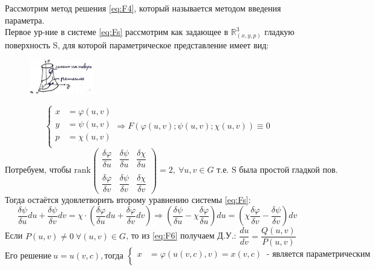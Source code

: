 \begin{proposition}
	Рассмотрим метод решения \eqref{eq:F4}, который называется методом введения параметра. \\
	Первое ур-ние в системе \eqref{eq:Fs} рассмотрим как задающее в $\mathbb{ R }^3_{(x, y, p)} $ гладкую поверхность S, для которой параметрическое представление имеет вид:
	\begin{figure}[!h]
		\centering
		\includegraphics[width = 0.25\textwidth]{image_1.jpeg}
	\end{figure}	
	\[
	\left\{
	\begin{aligned}
		x &= \varphi(u, v)  \\
		y &= \psi(u, v) \\   
		p &= \chi(u, v) \\
	\end{aligned}
	\right.   
	\Rightarrow  F(\varphi(u, v); \psi(u, v); \chi(u, v)) \equiv 0                                                   
	\]
	\[
		\text{Потребуем, чтобы rank}
		\begin{pmatrix}
			\dfrac{\delta\varphi}{\delta u} & \dfrac{\delta \psi}{\delta u} & \dfrac{\delta \chi}{\delta u} \\
			\\
			\dfrac{\delta\varphi}{\delta v} & \dfrac{\delta \psi}{\delta v} & \dfrac{\delta \chi}{\delta v}
		\end{pmatrix} = 2, \ \forall u, v \in G \text{ т.е. S была простой гладкой пов.}
	\]
	Тогда остаётся удовлетворить второму уравнению системы \eqref{eq:Fs}: \\
	\begin{equation} \label{eq:F6}
		\frac{\delta \psi}{\delta u} du + \frac{\delta \psi}{\delta v} dv = \chi \cdot \left(\frac{\delta \varphi}{\delta u}du + \frac{\delta \varphi}{\delta v}dv\right) \Rightarrow \left( \frac{\delta \psi}{\delta u} - \chi \frac{\delta \varphi}{\delta u} \right) du = \left(\chi \frac{\delta \varphi}{\delta v} - \frac{\delta \psi}{\delta v} \right) dv
	\end{equation}
	Если $ P(u, v) \neq 0 \ \forall (u,v) \in G$, то из \eqref{eq:F6} получаем Д.У.: $ \dfrac{du}{dv} = \dfrac{Q(u, v)}{P(u, v)} $
	\[
		\text{Его решение} \  u = u(v, c),  \text{тогда } \left\{
		\begin{aligned}
			x &= \varphi(u(v, c), v) = x(v, c)  \ \text{ - является параметрическим}\\

\end{aligned}\]
\end{proposition}
